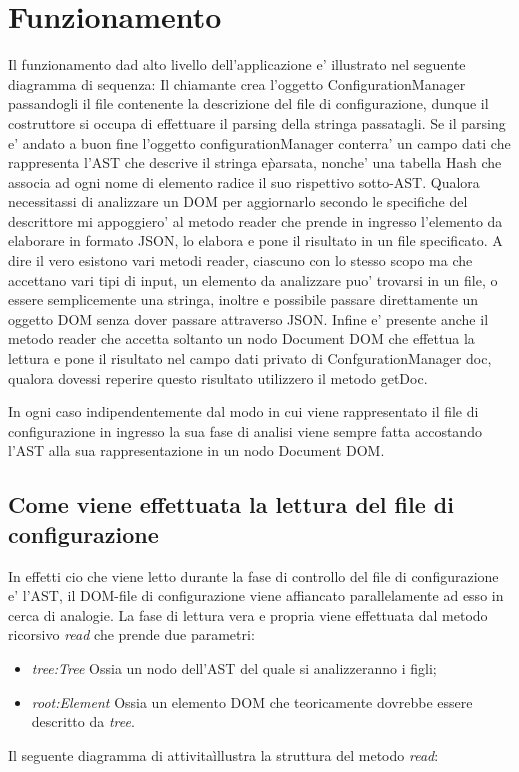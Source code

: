 \documentclass[11pt,titlepage,a4paper,twoside,openany]{book}
\begin{document}
\section{Funzionamento}
Il funzionamento dad alto livello dell'applicazione e' illustrato nel seguente diagramma di sequenza:
Il chiamante crea l'oggetto ConfigurationManager passandogli il file contenente la descrizione del file di configurazione, dunque il costruttore si occupa di effettuare il parsing della stringa passatagli.
Se il parsing e' andato a buon fine l'oggetto configurationManager conterra' un campo dati che rappresenta l'AST che descrive il stringa e\` parsata, nonche' una tabella Hash che associa ad ogni nome di elemento radice il suo rispettivo sotto-AST.
Qualora necessitassi di analizzare un DOM per aggiornarlo secondo le specifiche del descrittore mi appoggiero' al metodo reader che prende in ingresso l'elemento da elaborare in formato JSON, lo elabora e pone il risultato in un file specificato.
A dire il vero esistono vari metodi reader, ciascuno con lo stesso scopo ma che accettano vari tipi di input, un elemento da analizzare puo' trovarsi in un file, o essere semplicemente una stringa, inoltre e possibile passare direttamente un oggetto DOM senza dover passare attraverso JSON. 
Infine e' presente anche il metodo reader che accetta soltanto un nodo Document DOM che effettua la lettura e pone il risultato nel campo dati privato di ConfgurationManager doc, qualora dovessi reperire questo risultato utilizzero il metodo getDoc.

In ogni caso indipendentemente dal modo in cui viene rappresentato il file di configurazione in ingresso la sua fase di analisi viene sempre fatta accostando l'AST alla sua rappresentazione in un nodo Document DOM.

\subsection{Come viene effettuata la lettura del file di configurazione}
In effetti cio che viene letto durante la fase di controllo del file di configurazione e' l'AST, il DOM-file di configurazione viene affiancato parallelamente ad esso in cerca di analogie.
La fase di lettura vera e propria viene effettuata dal metodo ricorsivo \textit{read} che prende due parametri:
\begin{itemize}
\item \textit{tree:Tree} Ossia un nodo dell'AST del quale si analizzeranno i figli;
\item \textit{root:Element} Ossia un elemento DOM che teoricamente dovrebbe essere descritto da \textit{tree}.
\end{itemize}
Il seguente diagramma di attivita\` illustra la struttura del metodo \textit{read}:
\end{document}
